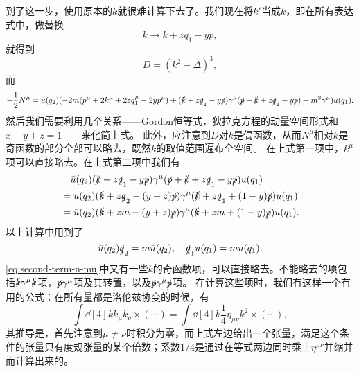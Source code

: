\documentclass[hyperref, UTF8, a4paper]{ctexart}
\begin{document}
到了这一步，使用原本的$k$就很难计算下去了。我们现在将$k'$当成$k$，即在所有表达式中，做替换
\begin{equation}
    k \longrightarrow k + z q_1 - y p,
    \label{sec:vertex-one-loop-k-replacement}
\end{equation}
就得到
\begin{equation}
    D = (k^2 - \Delta)^3,
    \label{eq:final-d}
\end{equation}
而
\begin{equation}
    - \frac{1}{2} N^\mu = \bar{u}(q_2) (- 2 m (p^\mu + 2 k^\mu + 2 z q_1^\mu - 2 y p^\mu) + (\slashed{k} + z \slashed{q}_1 - y \slashed{p}) \gamma^\mu (\slashed{p} + \slashed{k} + z \slashed{q}_1 - y \slashed{p}) + m^2 \gamma^\mu) u(q_1).
\end{equation}
然后我们需要利用几个关系——Gordon恒等式，狄拉克方程的动量空间形式和$x+y+z=1$——来化简上式。
此外，应注意到$D$对$k$是偶函数，从而$N^\mu$相对$k$是奇函数的部分全部可以略去，既然$k$的取值范围遍布全空间。
在上式第一项中，$k^\mu$项可以直接略去。在上式第二项中我们有
\begin{equation}
    \begin{aligned}
        &\quad \bar{u}(q_2) (\slashed{k} + z \slashed{q}_1 - y \slashed{p}) \gamma^\mu (\slashed{p} + \slashed{k} + z \slashed{q}_1 - y \slashed{p}) u(q_1) \\
        &= \bar{u}(q_2) (\slashed{k} + z \slashed{q}_2 - (y + z) \slashed{p}) \gamma^\mu (\slashed{k} + z \slashed{q}_1 + (1 - y) \slashed{p}) u(q_1) \\
        &= \bar{u}(q_2) (\slashed{k} + z m - (y + z) \slashed{p}) \gamma^\mu (\slashed{k} + z m + (1 - y) \slashed{p}) u(q_1).
    \end{aligned}
    \label{eq:second-term-n-mu}
\end{equation}
以上计算中用到了
\[
    \bar{u}(q_2) \slashed{q}_2 = m \bar{u}(q_2), \quad \slashed{q}_1 u(q_1) = m u(q_1).
\]
\eqref{eq:second-term-n-mu}中又有一些$k$的奇函数项，可以直接略去。不能略去的项包括$\slashed{k} \gamma^\mu \slashed{k}$项，$\slashed{p} \gamma^\mu$项及其转置，以及$\slashed{p} \gamma^\mu \slashed{p}$项。
在计算这些项时，我们有这样一个有用的公式：在所有量都是洛伦兹协变的时候，有
\begin{equation}
    \int \dd[4]{k} k_\mu k_\nu \times (\cdots) = \int \dd[4]{k} \frac{1}{4} \eta_{\mu \nu} k^2 \times (\cdots),
    \label{eq:k-mu-nu-to-square}
\end{equation}
其推导是，首先注意到$\mu \neq \nu$时积分为零，而上式左边给出一个张量，满足这个条件的张量只有度规张量的某个倍数；系数$1/4$是通过在等式两边同时乘上$\eta^{\mu \nu}$并缩并而计算出来的。
\end{document}
